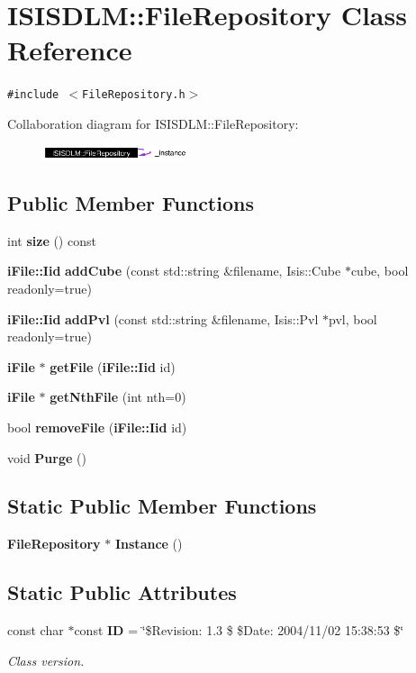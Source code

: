 \section{ISISDLM::File\-Repository Class Reference}
\label{classISISDLM_1_1FileRepository}
{\tt \#include $<$File\-Repository.h$>$}

Collaboration diagram for ISISDLM::File\-Repository:\begin{figure}[H]
\begin{center}
\leavevmode
\includegraphics[width=120pt]{classISISDLM_1_1FileRepository__coll__graph}
\end{center}
\end{figure}
\subsection*{Public Member Functions}
\begin{CompactItemize}
\item 
int {\bf size} () const
\item 
{\bf i\-File::Iid} {\bf add\-Cube} (const std::string \&filename, Isis::Cube $\ast$cube, bool readonly=true)
\item 
{\bf i\-File::Iid} {\bf add\-Pvl} (const std::string \&filename, Isis::Pvl $\ast$pvl, bool readonly=true)
\item 
{\bf i\-File} $\ast$ {\bf get\-File} ({\bf i\-File::Iid} id)
\item 
{\bf i\-File} $\ast$ {\bf get\-Nth\-File} (int nth=0)
\item 
bool {\bf remove\-File} ({\bf i\-File::Iid} id)
\item 
void {\bf Purge} ()
\end{CompactItemize}
\subsection*{Static Public Member Functions}
\begin{CompactItemize}
\item 
{\bf File\-Repository} $\ast$ {\bf Instance} ()
\end{CompactItemize}
\subsection*{Static Public Attributes}
\begin{CompactItemize}
\item 
const char $\ast$const {\bf ID} = \char`\"{}\$Revision: 1.3 \$ \$Date: 2004/11/02 15:38:53 \$\char`\"{}
\begin{CompactList}\small\item\em Class version. \item\end{CompactList}\end{CompactItemize}
